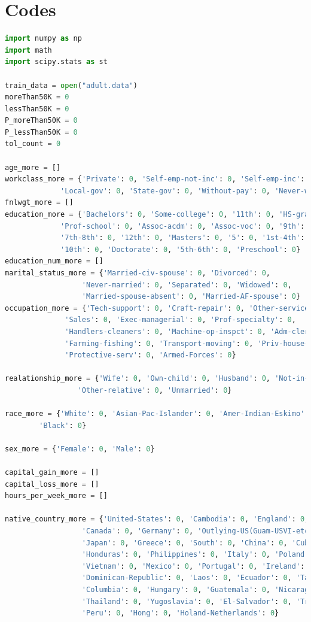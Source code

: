 ﻿\documentclass[a4paper, 11pt]{article}
\begin{document}
\section{Codes}
\begin{lstlisting}[language=Python,frame=single]
import numpy as np
import math
import scipy.stats as st

train_data = open("adult.data")
moreThan50K = 0
lessThan50K = 0
P_moreThan50K = 0
P_lessThan50K = 0
tol_count = 0

age_more = []
workclass_more = {'Private': 0, 'Self-emp-not-inc': 0, 'Self-emp-inc': 0, 'Federal-gov': 0,
             'Local-gov': 0, 'State-gov': 0, 'Without-pay': 0, 'Never-worked': 0}
fnlwgt_more = []
education_more = {'Bachelors': 0, 'Some-college': 0, '11th': 0, 'HS-grad': 0,
             'Prof-school': 0, 'Assoc-acdm': 0, 'Assoc-voc': 0, '9th': 0,
             '7th-8th': 0, '12th': 0, 'Masters': 0, '5': 0, '1st-4th': 0,
             '10th': 0, 'Doctorate': 0, '5th-6th': 0, 'Preschool': 0}
education_num_more = []
marital_status_more = {'Married-civ-spouse': 0, 'Divorced': 0,
                  'Never-married': 0, 'Separated': 0, 'Widowed': 0,
                  'Married-spouse-absent': 0, 'Married-AF-spouse': 0}
occupation_more = {'Tech-support': 0, 'Craft-repair': 0, 'Other-service': 0,
              'Sales': 0, 'Exec-managerial': 0, 'Prof-specialty': 0,
              'Handlers-cleaners': 0, 'Machine-op-inspct': 0, 'Adm-clerical': 0,
              'Farming-fishing': 0, 'Transport-moving': 0, 'Priv-house-serv': 0,
              'Protective-serv': 0, 'Armed-Forces': 0}

realationship_more = {'Wife': 0, 'Own-child': 0, 'Husband': 0, 'Not-in-family': 0,
                 'Other-relative': 0, 'Unmarried': 0}

race_more = {'White': 0, 'Asian-Pac-Islander': 0, 'Amer-Indian-Eskimo': 0, 'Other': 0,
        'Black': 0}

sex_more = {'Female': 0, 'Male': 0}

capital_gain_more = []
capital_loss_more = []
hours_per_week_more = []

native_country_more = {'United-States': 0, 'Cambodia': 0, 'England': 0, 'Puerto-Rico': 0,
                  'Canada': 0, 'Germany': 0, 'Outlying-US(Guam-USVI-etc)': 0, 'India': 0,
                  'Japan': 0, 'Greece': 0, 'South': 0, 'China': 0, 'Cuba': 0, 'Iran': 0,
                  'Honduras': 0, 'Philippines': 0, 'Italy': 0, 'Poland': 0, 'Jamaica': 0,
                  'Vietnam': 0, 'Mexico': 0, 'Portugal': 0, 'Ireland': 0, 'France': 0,
                  'Dominican-Republic': 0, 'Laos': 0, 'Ecuador': 0, 'Taiwan': 0, 'Haiti': 0,
                  'Columbia': 0, 'Hungary': 0, 'Guatemala': 0, 'Nicaragua': 0, 'Scotland': 0,
                  'Thailand': 0, 'Yugoslavia': 0, 'El-Salvador': 0, 'Trinadad&Tobago': 0,
                  'Peru': 0, 'Hong': 0, 'Holand-Netherlands': 0}


\end{lstlisting}
\end{document}
